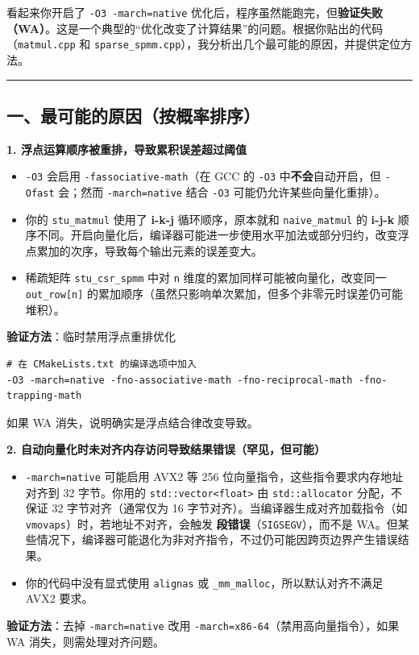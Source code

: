 \documentclass[11pt, a4paper]{article}
\begin{document}
\begin{aibox}
看起来你开启了 \texttt{-O3 -march=native} 优化后，程序虽然能跑完，但\textbf{验证失败（WA）}。这是一个典型的“优化改变了计算结果”的问题。根据你贴出的代码（\texttt{matmul.cpp} 和 \texttt{sparse\_spmm.cpp}），我分析出几个最可能的原因，并提供定位方法。

\begin{center}\rule{\textwidth}{0.4pt}\end{center}

\subsection*{一、最可能的原因（按概率排序）}

\textbf{1. 浮点运算顺序被重排，导致累积误差超过阈值}
\begin{itemize}
    \item \texttt{-O3} 会启用 \texttt{-fassociative-math}（在 GCC 的 \texttt{-O3} 中\textbf{不会}自动开启，但 \texttt{-Ofast} 会；然而 \texttt{-march=native} 结合 \texttt{-O3} 可能仍允许某些向量化重排）。
    \item 你的 \texttt{stu\_matmul} 使用了 \textbf{i-k-j} 循环顺序，原本就和 \texttt{naive\_matmul} 的 \textbf{i-j-k} 顺序不同。开启向量化后，编译器可能进一步使用水平加法或部分归约，改变浮点累加的次序，导致每个输出元素的误差变大。
    \item 稀疏矩阵 \texttt{stu\_csr\_spmm} 中对 \texttt{n} 维度的累加同样可能被向量化，改变同一 \texttt{out\_row[n]} 的累加顺序（虽然只影响单次累加，但多个非零元时误差仍可能堆积）。
\end{itemize}
\textbf{验证方法}：临时禁用浮点重排优化
\begin{tcolorbox}[colback=white,colframe=gray!50!white,boxrule=0.5pt,arc=2pt,left=5pt,right=5pt,top=5pt,bottom=5pt]
\begin{verbatim}
# 在 CMakeLists.txt 的编译选项中加入
-O3 -march=native -fno-associative-math -fno-reciprocal-math -fno-trapping-math
\end{verbatim}
\end{tcolorbox}
如果 WA 消失，说明确实是浮点结合律改变导致。

\vspace{0.5em}
\textbf{2. 自动向量化时未对齐内存访问导致结果错误（罕见，但可能）}
\begin{itemize}
    \item \texttt{-march=native} 可能启用 AVX2 等 256 位向量指令，这些指令要求内存地址对齐到 32 字节。你用的 \texttt{std::vector<float>} 由 \texttt{std::allocator} 分配，不保证 32 字节对齐（通常仅为 16 字节对齐）。当编译器生成对齐加载指令（如 \texttt{vmovaps}）时，若地址不对齐，会触发 \textbf{段错误}（\texttt{SIGSEGV}），而不是 WA。但某些情况下，编译器可能退化为非对齐指令，不过仍可能因跨页边界产生错误结果。
    \item 你的代码中没有显式使用 \texttt{alignas} 或 \texttt{\_mm\_malloc}，所以默认对齐不满足 AVX2 要求。
\end{itemize}
\textbf{验证方法}：去掉 \texttt{-march=native} 改用 \texttt{-march=x86-64}（禁用高向量指令），如果 WA 消失，则需处理对齐问题。


\end{aibox}
\end{document}
